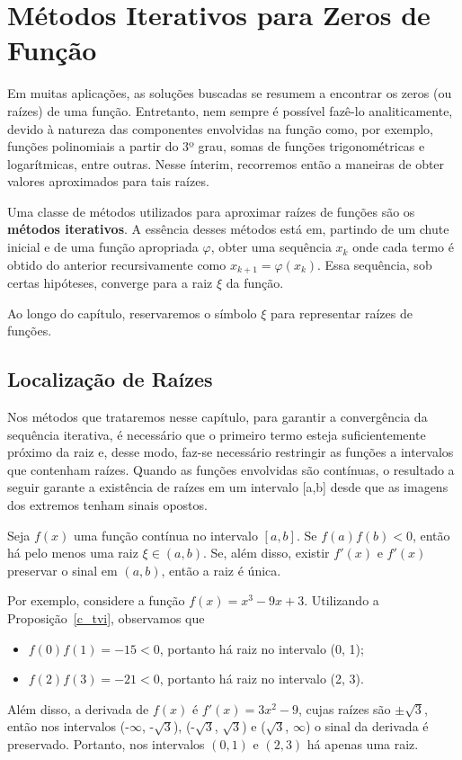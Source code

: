 \chapter{Métodos Iterativos para Zeros de Função}

Em muitas aplicações, as soluções buscadas se resumem a encontrar os zeros (ou raízes) de uma função. Entretanto, nem sempre é possível fazê-lo analiticamente, devido à natureza das componentes envolvidas na função como, por exemplo, funções polinomiais a partir do 3º grau, somas de funções trigonométricas e logarítmicas, entre outras. Nesse ínterim, recorremos então a maneiras de obter valores aproximados para tais raízes. 

Uma classe de métodos utilizados para aproximar raízes de funções são os \textbf{métodos iterativos}. A essência desses métodos está em, partindo de um chute inicial e de uma função apropriada $\varphi$, obter uma sequência $x_k$ onde cada termo é obtido do anterior recursivamente como $x_{k+1} = \varphi(x_k)$. Essa sequência, sob certas hipóteses, converge para a raiz $\xi$ da função.


Ao longo do capítulo, reservaremos o símbolo $\xi$ para representar raízes de funções.

\section{Localização de Raízes}

Nos métodos que trataremos nesse capítulo, para garantir a convergência da sequência iterativa, é necessário que o primeiro termo esteja suficientemente próximo da raiz e, desse modo, faz-se necessário restringir as funções a intervalos que contenham raízes. Quando as funções envolvidas são contínuas, o resultado a seguir garante a existência de raízes em um intervalo [a,b] desde que as imagens dos extremos tenham sinais opostos.

\begin{prop}\label{c_tvi}%
Seja $f(x)$ uma função contínua no intervalo $[a, b]$. Se $f(a)f(b) < 0$, então há pelo menos uma raiz $\xi \in (a,b)$. Se, além disso, existir $f'(x)$ e $f'(x)$ preservar o sinal em $(a,b)$, então a raiz é única.
\end{prop} %
Por exemplo, considere a função $f(x) = x^3 - 9x + 3$. Utilizando a Proposição~\ref{c_tvi}, observamos que
\begin{itemize}
    \item $f(0)f(1) = -15 < 0$, portanto há raiz no intervalo (0, 1);
    \item $f(2)f(3) = -21 < 0$, portanto há raiz no intervalo (2, 3).
\end{itemize}
Além disso, a derivada de $f(x)$ é $f'(x) = 3x^2 - 9$, cujas raízes são $\pm \sqrt{3}$, então nos intervalos (-$\infty$, -$\sqrt{3}$), (-$\sqrt{3}$, $\sqrt{3}$) e ($\sqrt{3}$, $\infty$) o sinal da derivada é preservado. Portanto, nos intervalos $(0, 1)$ e $(2, 3)$ há apenas uma raiz.

